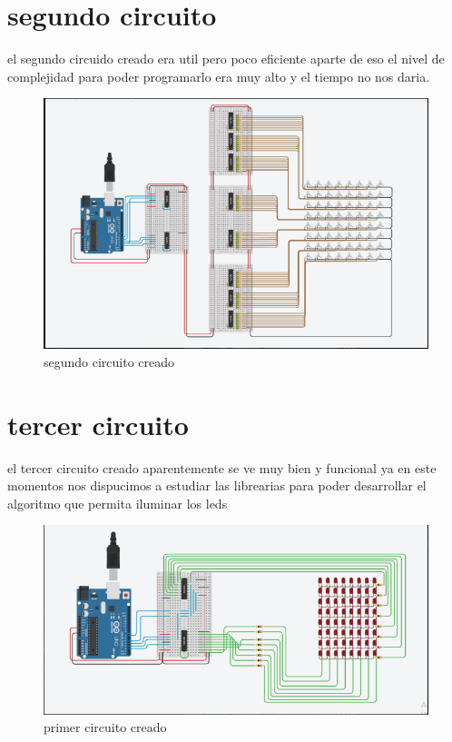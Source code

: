 \documentclass{article}
\begin{document}
\section{segundo circuito}
el segundo circuido creado era util pero poco eficiente aparte de eso el nivel de complejidad para poder programarlo era muy alto y el tiempo no nos daria.
\begin{figure}[h!]
\centering
\includegraphics[scale=0.2]{circuito2.PNG}
\caption{segundo circuito creado}
\label{fig:universe}
\end{figure}
\section{tercer circuito}
el tercer circuito creado aparentemente se ve muy bien y funcional ya en este momentos nos dispucimos a estudiar las librearias para poder desarrollar el algoritmo que permita iluminar los leds
\begin{figure}[h!]
\centering
\includegraphics[scale=0.2]{circuito3.PNG}
\caption{primer circuito creado}
\label{fig:universe}
\end{figure}
\end{document}
